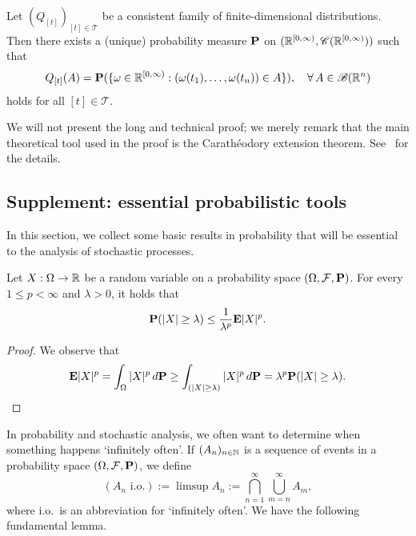 \begin{theorem}
\label{thm:D-K-ext}
    Let $(Q_{[t]})_{[t]\in\mathcal{T}}$ be a consistent family of finite-dimensional distributions. Then there exists a (unique) probability measure $\mathbf{P}$ on $(\mathbb{R}^{[0,\infty)},\mathscr{C}(\mathbb{R}^{[0,\infty)}))$ such that
    \begin{equation}
    Q_{[t]}(A) = \mathbf{P}(\{\omega\in\mathbb{R}^{[0,\infty)} : (\omega(t_1),\ldots,\omega(t_n))\in A\}), \quad\forall\,A\in\mathscr{B}(\mathbb{R}^n)
    \end{equation}
    holds for all $[t]\in\mathcal{T}$.
\end{theorem}

We will not present the long and technical proof; we merely remark that the main theoretical tool used in the proof is the Carath\'{e}odory extension theorem. See~\cite[Section 2.2A]{KS} for the details.

\subsection{Supplement: essential probabilistic tools}

In this section, we collect some basic results in probability that will be essential to the analysis of stochastic processes.

\begin{proposition}
\label{prop:chebyshev}
    Let $X:\Omega\to\mathbb{R}$ be a random variable on a probability space $(\Omega,\mathcal{F},\mathbf{P})$. For every $1\le p<\infty$ and $\lambda>0$, it holds that
    \begin{equation}
        \mathbf{P}(|X|\ge\lambda) \le \frac{1}{\lambda^p}\mathbf{E}|X|^p.
    \end{equation}
\end{proposition}

\begin{proof}
    We observe that
    \begin{equation*}
        \mathbf{E}|X|^p = \int_\Omega |X|^p\,d\mathbf{P} \ge \int_{(|X|\ge\lambda)} |X|^p\,d\mathbf{P} = \lambda^p \mathbf{P}(|X|\ge\lambda). \qedhere
    \end{equation*}
\end{proof}

In probability and stochastic analysis, we often want to determine when something happens `infinitely often'. If $(A_n)_{n\in\mathbb{N}}$ is a sequence of events in a probability space $(\Omega,\mathcal{F},\mathbf{P})$, we define
\begin{equation}
    (A_n \text{ i.o.}) := \limsup A_n := \bigcap_{n=1}^\infty\bigcup_{m=n}^\infty A_m,
\end{equation}
where i.o.\ is an abbreviation for `infinitely often'. We have the following fundamental lemma.

